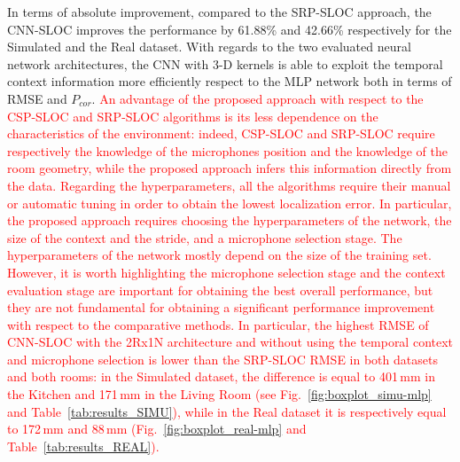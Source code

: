 \documentclass[review]{elsarticle}
\newcommand{\figref}[1]{Fig.~\ref{#1}}
\newcommand{\tableref}[1]{Table~\ref{#1}}
\begin{document}
In terms of absolute improvement, compared to the SRP-SLOC approach, the CNN-SLOC improves the performance by 61.88\% and 42.66\% respectively for the Simulated and the Real dataset. With regards to the two evaluated neural network architectures, the CNN with 3-D kernels is able to exploit the temporal context information more efficiently respect to the MLP network both in terms of RMSE and $P_{cor}$.
\textcolor{red}{An advantage of the proposed approach with respect to the CSP-SLOC and SRP-SLOC algorithms is its less dependence on the characteristics of the environment: indeed, CSP-SLOC and SRP-SLOC require respectively the knowledge of the microphones position and the knowledge of the room geometry, while the proposed approach infers this information directly from the data. Regarding the hyperparameters, all the algorithms require their manual or automatic tuning in order to obtain the lowest localization error. In particular, the proposed approach requires choosing the hyperparameters of the network, the size of the context and the stride, and a microphone selection stage. The hyperparameters of the network mostly depend on the size of the training set. However, it is worth highlighting the microphone selection stage and the context evaluation stage are important for obtaining the best overall performance, but they are not fundamental for obtaining a significant performance improvement with respect to the comparative methods. In particular, the highest RMSE of CNN-SLOC with the 2Rx1N architecture and without using the temporal context and microphone selection is lower than the SRP-SLOC RMSE in both datasets and both rooms: in the Simulated dataset, the difference is equal to 401\,mm in the Kitchen and 171\,mm in the Living Room (see \figref{fig:boxplot_simu-mlp} and \tableref{tab:results_SIMU}), while in the Real dataset it is respectively equal to 172\,mm and 88\,mm (\figref{fig:boxplot_real-mlp} and \tableref{tab:results_REAL}).
 }

\end{document}
